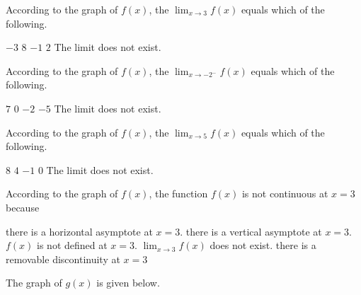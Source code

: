 \documentclass[11pt]{article}
\begin{document}
\begin{questions}
\begin{multiplechoice}{5}

\question According to the graph of $f(x)$, the $\lim_{x\to 3}f(x) $ equals which of the following.
\begin{answers}{3}
\ans $-3$
\ans $8$
\ans $-1$
\ans $2$
\ans The limit does not exist.
\end{answers}



\question According to the graph of $f(x)$, the $\lim_{x\to -2^-}f(x) $ equals which of the following.
\begin{answers}{3}
\ans $7$
\ans $0$
\ans $-2$
\ans $-5$
\ans The limit does not exist.
\end{answers}


\question According to the graph of $f(x)$, the $\lim_{x\to 5}f(x) $ equals which of the following.
\begin{answers}{3}
\ans $8$
\ans $4$
\ans $-1$
\ans $0$
\ans The limit does not exist.
\end{answers}





\question According to the graph of $f(x)$, the function $f(x)$ is not continuous at $x=3$ because
\begin{answers}{3}
\ans there is a horizontal asymptote at $x=3$. 
\ans there is a vertical asymptote at $x=3$.
\ans $f(x)$ is not defined at $x=3$.
\ans $\lim_{x\to 3}f(x)$ does not exist.
\ans there is a removable discontinuity at $x=3$
\end{answers}



\newpage

\question The graph of $g(x)$ is given below.\\


\end{multiplechoice}
\end{questions}
\end{document}
